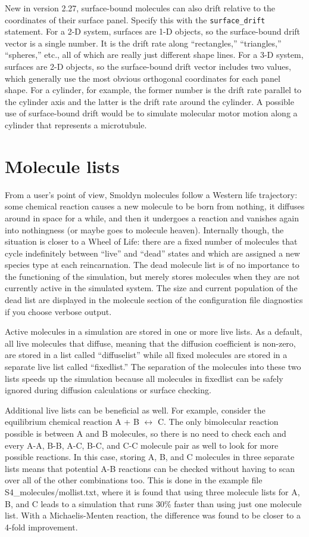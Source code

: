 \documentclass {scrbook}
\newcommand {\ttt} {\texttt}
\begin{document}
New in version 2.27, surface-bound molecules can also drift relative to the coordinates of their surface panel. Specify this with the \ttt{surface\_drift} statement. For a 2-D system, surfaces are 1-D objects, so the surface-bound drift vector is a single number. It is the drift rate along ``rectangles,'' ``triangles,'' ``spheres,'' etc., all of which are really just different shape lines. For a 3-D system, surfaces are 2-D objects, so the surface-bound drift vector includes two values, which generally use the most obvious orthogonal coordinates for each panel shape. For a cylinder, for example, the former number is the drift rate parallel to the cylinder axis and the latter is the drift rate around the cylinder. A possible use of surface-bound drift would be to simulate molecular motor motion along a cylinder that represents a microtubule.

\section{Molecule lists}

From a user's point of view, Smoldyn molecules follow a Western life trajectory: some chemical reaction causes a new molecule to be born from nothing, it diffuses around in space for a while, and then it undergoes a reaction and vanishes again into nothingness (or maybe goes to molecule heaven). Internally though, the situation is closer to a Wheel of Life: there are a fixed number of molecules that cycle indefinitely between ``live'' and ``dead'' states and which are assigned a new species type at each reincarnation. The dead molecule list is of no importance to the functioning of the simulation, but merely stores molecules when they are not currently active in the simulated system. The size and current population of the dead list are displayed in the molecule section of the configuration file diagnostics if you choose verbose output.

Active molecules in a simulation are stored in one or more live lists. As a default, all live molecules that diffuse, meaning that the diffusion coefficient is non-zero, are stored in a list called ``diffuselist'' while all fixed molecules are stored in a separate live list called ``fixedlist.'' The separation of the molecules into these two lists speeds up the simulation because all molecules in fixedlist can be safely ignored during diffusion calculations or surface checking.

Additional live lists can be beneficial as well. For example, consider the equilibrium chemical reaction A + B $\leftrightarrow$ C. The only bimolecular reaction possible is between A and B molecules, so there is no need to check each and every A-A, B-B, A-C, B-C, and C-C molecule pair as well to look for more possible reactions. In this case, storing A, B, and C molecules in three separate lists means that potential A-B reactions can be checked without having to scan over all of the other combinations too. This is done in the example file S4\_molecules/mollist.txt, where it is found that using three molecule lists for A, B, and C leads to a simulation that runs 30\% faster than using just one molecule list. With a Michaelis-Menten reaction, the difference was found to be closer to a 4-fold improvement.
\end{document}
